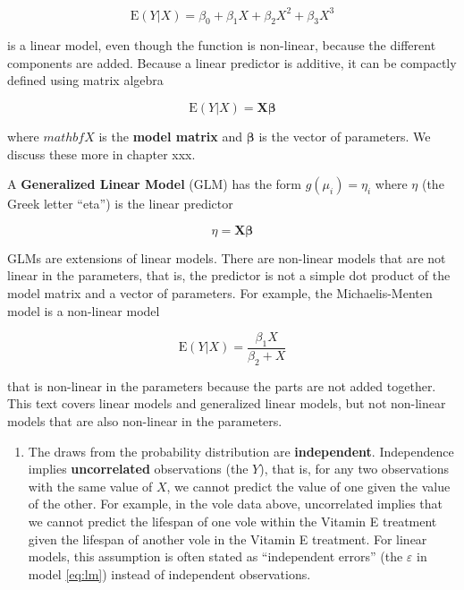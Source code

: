 \documentclass[]{book}
\providecommand{\tightlist}{%
  \setlength{\itemsep}{0pt}\setlength{\parskip}{0pt}}
\begin{document}
\begin{equation}
\mathrm{E}(Y|X) = \beta_0 + \beta_1 X + \beta_2 X^2 + \beta_3 X^3
\end{equation}

is a linear model, even though the function is non-linear, because the
different components are added. Because a linear predictor is additive,
it can be compactly defined using matrix algebra

\begin{equation}
\mathrm{E}(Y|X) = \mathbf{X}\boldsymbol{\beta}
\end{equation}

where \(mathbf{X}\) is the \textbf{model matrix} and
\(\boldsymbol{\beta}\) is the vector of parameters. We discuss these
more in chapter xxx.

A \textbf{Generalized Linear Model} (GLM) has the form
\(g(\mu_i) = \eta_i\) where \(\eta\) (the Greek letter ``eta'') is the
linear predictor

\begin{equation}
\eta = \mathbf{X}\boldsymbol{\beta} 
\end{equation}

GLMs are extensions of linear models. There are non-linear models that
are not linear in the parameters, that is, the predictor is not a simple
dot product of the model matrix and a vector of parameters. For example,
the Michaelis-Menten model is a non-linear model

\begin{equation}
\mathrm{E}(Y|X)  = \frac{\beta_1 X}{\beta_2 + X}
\end{equation}

that is non-linear in the parameters because the parts are not added
together. This text covers linear models and generalized linear models,
but not non-linear models that are also non-linear in the parameters.

\begin{enumerate}
\def\labelenumi{\arabic{enumi}.}
\setcounter{enumi}{1}
\tightlist
\item
  The draws from the probability distribution are \textbf{independent}.
  Independence implies \textbf{uncorrelated} observations (the \(Y\)),
  that is, for any two observations with the same value of \(X\), we
  cannot predict the value of one given the value of the other. For
  example, in the vole data above, uncorrelated implies that we cannot
  predict the lifespan of one vole within the Vitamin E treatment given
  the lifespan of another vole in the Vitamin E treatment. For linear
  models, this assumption is often stated as ``independent errors'' (the
  \(\varepsilon\) in model \eqref{eq:lm}) instead of independent
  observations.
\end{enumerate}
\end{document}
